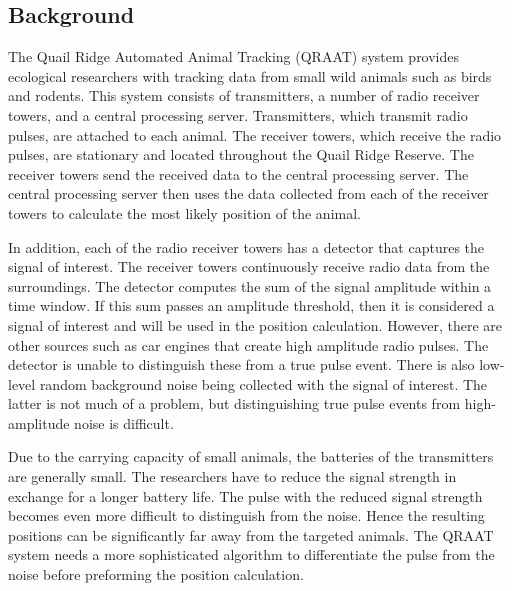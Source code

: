\documentclass[twoside]{article}
\begin{document}
\subsection{Background}
The Quail Ridge Automated Animal Tracking (QRAAT) system provides ecological researchers with tracking data from small wild animals such as birds and rodents. This system consists of transmitters, a number of radio receiver towers, and a central processing server. Transmitters, which transmit radio pulses, are attached to each animal. The receiver towers, which receive the radio pulses, are stationary and located throughout the Quail Ridge Reserve. The receiver towers send the received data to the central processing server. The central processing server then uses the data collected from each of the receiver towers to calculate the most likely position of the animal. 

In addition, each of the radio receiver towers has a detector that captures the signal of interest. The receiver towers continuously receive radio data from the surroundings. The detector computes the sum of the signal amplitude within a time window. If this sum passes an amplitude threshold, then it is considered a signal of interest and will be used in the position calculation. However, there are other sources such as car engines that create high amplitude radio pulses. The detector is unable to distinguish these from a true pulse event. There is also low-level random background noise being collected with the signal of interest. The latter is not much of a problem, but distinguishing true pulse events from high-amplitude noise is difficult.  

Due to the carrying capacity of small animals, the batteries of the transmitters are generally small. The researchers have to reduce the signal strength in exchange for a longer battery life. The pulse with the reduced signal strength becomes even more difficult to distinguish from the noise. Hence the resulting positions can be significantly far away from the targeted animals. The QRAAT system needs a more sophisticated algorithm to differentiate the pulse from the noise before preforming the position calculation.
\end{document}
